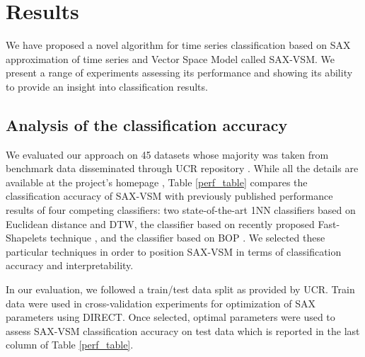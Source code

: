 \documentclass[conference]{IEEEtran}
\begin{document}
\section{Results} \label{results}
We have proposed a novel algorithm for time series classification based on SAX
approximation of time series and Vector Space Model called SAX-VSM. 
We present a range of experiments assessing its performance and showing
its ability to provide an insight into classification results.

\subsection{Analysis of the classification accuracy}
We evaluated our approach on 45 datasets whose majority was taken from benchmark 
data disseminated through UCR repository \cite{ucr}. While all the details are available at 
the project's homepage \cite{jmotif}, Table \ref{perf_table} compares the classification accuracy 
of SAX-VSM with previously published performance results of four competing classifiers: 
two state-of-the-art 1NN classifiers based on Euclidean distance and DTW, 
the classifier based on recently proposed Fast-Shapelets technique \cite{fast-shapelets}, 
and the classifier based on BOP \cite{bag_patterns}.
We selected these particular techniques in order to position SAX-VSM in terms of 
classification accuracy and interpretability. 

In our evaluation, we followed a train/test data split as provided by UCR. 
Train data were used in cross-validation experiments for optimization of 
SAX parameters using \mbox{DIRECT}. 
Once selected, optimal parameters were used to assess SAX-VSM classification 
accuracy on test data which is reported in the last column of Table \ref{perf_table}.
\end{document}
